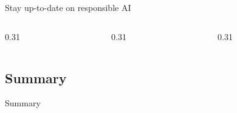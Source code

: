 \begin{frame}{Stay up-to-date on responsible AI}
  \begin{columns}[T,onlytextwidth]
    \begin{column}{0.31\textwidth}
      \begin{tdblock}[equal height group=rai]
      \end{tdblock}
    \end{column}
    \begin{column}{0.31\textwidth}
      \begin{tdblock}[equal height group=rai]
      \end{tdblock}
    \end{column}
    \begin{column}{0.31\textwidth}
      \begin{tdblock}[equal height group=rai]
      \end{tdblock}
    \end{column}
  \end{columns}
\end{frame}

\subsection{Summary}

\begin{frame}{Summary}
  \begin{statement}
    \substatement{}
  \end{statement}
\end{frame}

\chapterreferences
